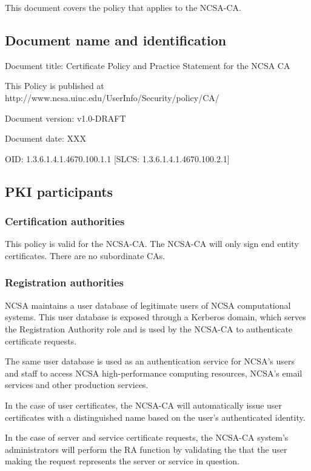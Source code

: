 \documentclass[10pt]{article}
\begin{document}
This document covers the policy that applies to the NCSA-CA.

\subsection{Document name and identification}

Document title: Certificate Policy and Practice Statement for the NCSA
CA

This Policy is published at
http://www.ncsa.uiuc.edu/UserInfo/Security/policy/CA/

Document version: v1.0-DRAFT

Document date: XXX

OID: 1.3.6.1.4.1.4670.100.1.1
[SLCS: 1.3.6.1.4.1.4670.100.2.1]

\subsection{PKI participants}

\subsubsection{Certification authorities}

This policy is valid for the NCSA-CA. The NCSA-CA will only sign end
entity certificates. There are no subordinate CAs.

\subsubsection{Registration authorities}

NCSA maintains a user database of legitimate users of NCSA
computational systems. This user database is exposed through a
Kerberos domain, which serves the Registration Authority role and is
used by the NCSA-CA to authenticate certificate requests.

 The same user database is used as an authentication service for
 NCSA’s users and staff to access NCSA high-performance computing
 resources, NCSA’s email services and other production services.

In the case of user certificates, the NCSA-CA will automatically issue
user certificates with a distinguished name based on the user's
authenticated identity.

In the case of server and service certificate requests, the NCSA-CA
system’s administrators will perform the RA function by validating the
that the user making the request represents the server or service in
question.
\end{document}
